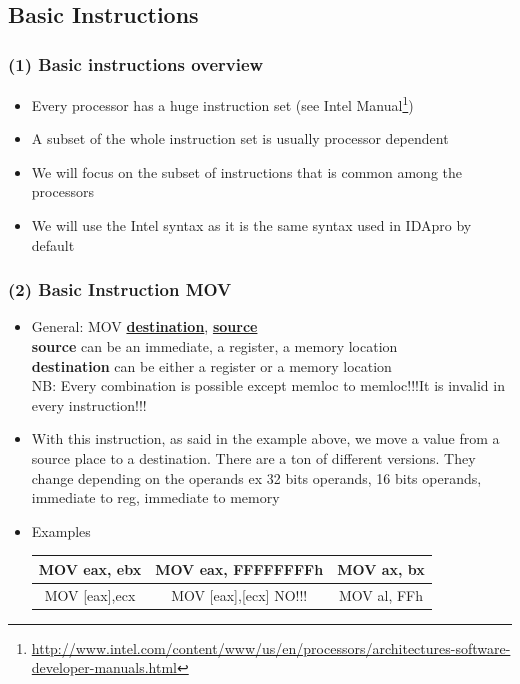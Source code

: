 \documentclass[]{beamer}
\begin{document}
	\subsection{Basic Instructions}
		\begin{frame}
			\frametitle{(1) Basic instructions overview}
				\begin{itemize}
					\item{Every processor has a huge instruction set (see Intel Manual\footnote{\url{http://www.intel.com/content/www/us/en/processors/architectures-software-developer-manuals.html}})}
					\item{A subset of the whole instruction set is usually processor dependent}
					\item{We will focus on the subset of instructions that is common among the processors}
					\item{We will use the Intel syntax as it is the same syntax used in IDApro by default}
				\end{itemize}
		\end{frame}
		\begin{frame}
			\frametitle{(2) Basic Instruction MOV}
				\begin{itemize}	
					\item{ General: MOV \underline{\textbf{destination}}, \underline{\textbf{source}}}\\
					\textbf{source} can be an immediate, a register, a memory location\\
					\textbf{destination} can be either a register  or a memory location\\
					NB: Every combination is possible except memloc to memloc!!!It is invalid in every instruction!!!

					\item{With this instruction, as said in the example above, we move a value from a source place to a destination. There are a ton of different versions. They change depending on the operands ex 32 bits operands, 16 bits operands, immediate to reg, immediate to memory }
				\item{Examples}
					\begin{table}[h]
						\begin{tabular}{|c|c|c|}
							\hline
							MOV eax, ebx&MOV eax, FFFFFFFFh &MOV ax, bx\\    \hline
							MOV [eax],ecx&MOV [eax],[ecx] \color{red}NO!!!&MOV al, FFh\\
							\hline
						\end{tabular}
					\end{table}
			\end{itemize}	

		\end{frame}
\end{document}
